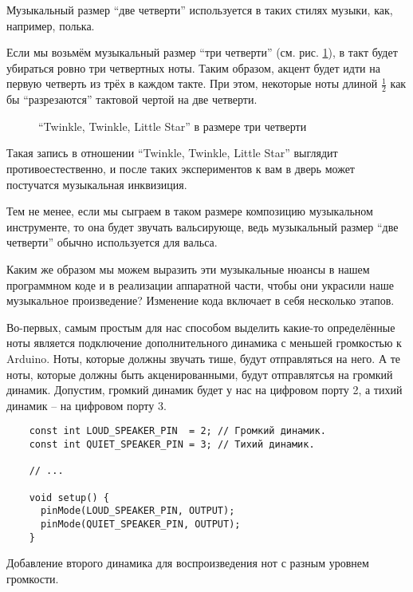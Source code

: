 \documentclass[../sparc.tex]{subfiles}
\begin{document}
Музыкальный размер ``две четверти'' используется в таких стилях музыки, как,
например, полька.

Если мы возьмём музыкальный размер ``три четверти''
(см. рис. \ref{fig:lilypond-musical-scale-example-4}), в такт будет убираться
ровно три четвертных ноты.  Таким образом, акцент будет идти на первую четверть
из трёх в каждом такте.  При этом, некоторые ноты длиной $\frac{1}{2}$ как бы
``разрезаются'' тактовой чертой на две четверти.

\begin{figure}[h]
  \centering
  \caption{``Twinkle, Twinkle, Little Star'' в размере три четверти}
  \label{fig:lilypond-musical-scale-example-4}
\end{figure}

Такая запись в отношении ``Twinkle, Twinkle, Little Star'' выглядит
противоестественно, и после таких экспериментов к вам в дверь может постучатся
музыкальная инквизиция.

Тем не менее, если мы сыграем в таком размере композицию музыкальном
инструменте, то она будет звучать вальсирующе, ведь музыкальный размер ``две
четверти'' обычно используется для вальса.

Каким же образом мы можем выразить эти музыкальные нюансы в нашем программном
коде и в реализации аппаратной части, чтобы они украсили наше музыкальное
произведение?  Изменение кода включает в себя несколько этапов.

Во-первых, самым простым для нас способом выделить какие-то определённые ноты
является подключение дополнительного динамика с меньшей громкостью к Arduino.
Ноты, которые должны звучать тише, будут отправляться на него.  А те ноты,
которые должны быть акценированными, будут отправлятсья на громкий динамик.
Допустим, громкий динамик будет у нас на цифровом порту 2, а тихий динамик -- на
цифровом порту 3.

\begin{listing}[ht]
  \begin{verbatim}
    const int LOUD_SPEAKER_PIN  = 2; // Громкий динамик.
    const int QUIET_SPEAKER_PIN = 3; // Тихий динамик.

    // ...

    void setup() {
      pinMode(LOUD_SPEAKER_PIN, OUTPUT);
      pinMode(QUIET_SPEAKER_PIN, OUTPUT);
    }
  \end{verbatim}
  \label{listing:adding-additional-speaker}
  \caption{Добавление второго динамика для воспроизведения нот с разным уровнем
    громкости.}
\end{listing}
\end{document}
